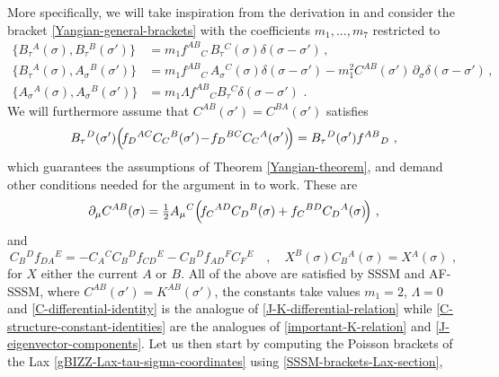 \documentclass[12pt]{article}
\numberwithin{equation}{section}
\begin{document}
More specifically, we will take inspiration from the derivation in \cite{Forger:1991ty} and consider the bracket \eqref{Yangian-general-brackets} with the coefficients $m_{1},...,m_{7}$ restricted to
\begin{equation}
\begin{aligned}\label{SSSM-brackets-Lax-section}
\{ B_{\tau}{}^{A}(\sigma),B_{\tau}{}^{B}(\sigma') \} &= m_{1}f^{AB}{}_{C} \, B_{\tau}{}^{C}(\sigma)\delta(\sigma-\sigma') \, ,
\\
\{ B_{\tau}{}^{A}(\sigma),A_{\sigma}{}^{B}(\sigma') \} &= m_{1}f^{AB}{}_{C} \, A_{\sigma}{}^{C}(\sigma)\delta(\sigma-\sigma')-m_{1}^2C^{AB}(\sigma') \, \partial_{\sigma}\delta(\sigma-\sigma') \, ,
\\
\{ A_{\sigma}{}^{A}(\sigma),A_{\sigma}{}^{B}(\sigma') \} &= m_{1}\Lambda f^{AB}{}_{C}B_{\tau}{}^{C}\delta(\sigma-\sigma') \,\, .
\end{aligned}
\end{equation}
We will furthermore assume that $C^{AB}(\sigma')=C^{BA}(\sigma')$ satisfies
\begin{equation}
B_{\tau}{}^{D}(\sigma')\Bigl(\!f_{D}{}^{AC}C_{C}{}^{B}(\sigma')\!-\!f_{D}{}^{BC}C_{C}{}^{A}(\sigma')\!\Bigr)=B_{\tau}{}^{D}(\sigma')f^{AB}{}_{D} \,\,  ,
\end{equation}
which guarantees the assumptions of Theorem \ref{Yangian-theorem},
and demand other conditions needed for the argument in \cite{Forger:1991ty} to work. These are
\begin{equation}\label{C-differential-identity}
\partial_{\mu} C^{AB}(\sigma)=\tfrac{1}{2}A_{\mu}{}^{C}\Bigl(\!f_{C}{}^{AD}C_{D}{}^{B}(\sigma)+f_{C}{}^{BD}C_{D}{}^{A}(\sigma)\!\Bigr) \,\, ,
\end{equation}
and 
\begin{equation}\label{C-structure-constant-identities}
C_{B}{}^{D}f_{DA}{}^{E}=-C_{A}{}^{C}C_{B}{}^{D}f_{CD}{}^{E}-C_{B}{}^{D}f_{AD}{}^{F}C_{F}{}^{E} 
\quad , \quad 
X^{B}(\sigma)C_{B}{}^{A}(\sigma)=X{}^{A}(\sigma) \,\, ,
\end{equation}
for $X$ either the current $A$ or $B$. All of the above are satisfied by SSSM and AF-SSSM, where $C^{AB}(\sigma')=K^{AB}(\sigma')$, the constants take values $m_{1}=2$, $\Lambda=0$ and \eqref{C-differential-identity} is the analogue of \eqref{J-K-differential-relation} while \eqref{C-structure-constant-identities} are the analogues of \eqref{important-K-relation} and \eqref{J-eigenvector-components}.
Let us then start by computing the Poisson brackets of the Lax \eqref{gBIZZ-Lax-tau-sigma-coordinates} using \eqref{SSSM-brackets-Lax-section},
\end{document}
